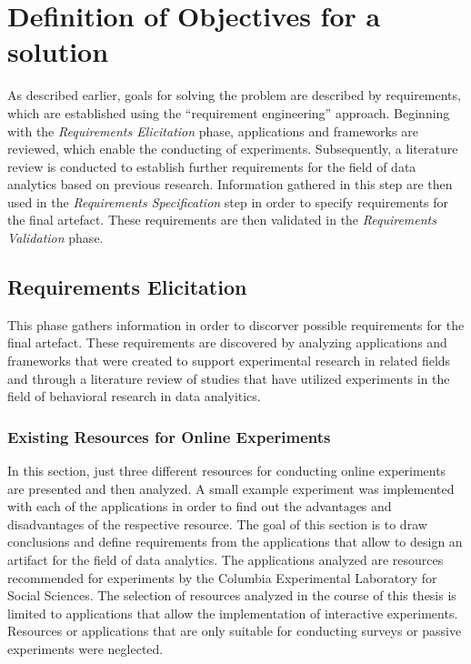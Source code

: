 \newpage\section{Definition of Objectives for a solution}\label{sec:objectForSolution}

As described earlier, goals for solving the problem are described by requirements, which are established using the \enquote{requirement engineering} approach. Beginning with the \textit{Requirements Elicitation} phase, applications and frameworks are reviewed, which enable the conducting of experiments. Subsequently, a literature review is conducted to establish further requirements for the field of data analytics based on previous research. Information gathered in this step are then used in the \textit{Requirements Specification} step in order to specify requirements for the final artefact. These requirements are then validated in the \textit{Requirements Validation} phase.

\subsection{Requirements Elicitation}

This phase gathers information in order to discorver possible requirements for the final artefact. These requirements are discovered by analyzing applications and frameworks that were created to support experimental research in related fields and through a literature review of studies that have utilized experiments in the field of behavioral research in data analyitics.

\subsubsection{Existing Resources for Online Experiments}\label{subsec:application_requirements}

In this section, just three different resources for conducting online experiments are presented and then analyzed. A small example experiment was implemented with each of the applications in order to find out the advantages and disadvantages of the respective resource. The goal of this section is to draw conclusions and define requirements from the applications that allow to design an artifact for the field of data analytics. The applications analyzed are resources recommended for experiments by the Columbia Experimental Laboratory for Social Sciences. The selection of resources analyzed in the course of this thesis is limited to applications that allow the implementation of interactive experiments. Resources or applications that are only suitable for conducting surveys or passive experiments were neglected.

